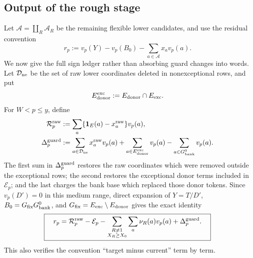 \documentclass[11pt]{article}
\numberwithin{equation}{section}
\theoremstyle{definition}
\theoremstyle{remark}
\newcommand{\1}{\mathbf 1}
\begin{document}
\subsection{Output of the rough stage}
\label{subsec:rough-output}

Let \(\mathcal A=\coprod_R\mathcal A_R\) be the remaining flexible lower
candidates, and use the residual convention
\begin{equation}
 r_p:=v_p(Y)-v_p(B_0)-\sum_{a\in\mathcal A}x_av_p(a).
 \label{eq:rough-residual-convention}
\end{equation}
We now give the full sign ledger rather than absorbing guard changes into
words.  Let \(\mathcal D_{\rm ne}\) be the set of raw lower coordinates
deleted in nonexceptional rows, and put
\[
 E_{\rm donor}^{\rm exc}:=E_{\rm donor}\cap E_{\rm exc}.
\]
For \(W<p\le y\), define
\begin{align}
 \mathcal R_p^{\rm raw}
   &:=\sum_a\{\1_E(a)-x_a^{\rm raw}\}v_p(a),\notag\\
 \Delta_p^{\rm guard}
   &:=\sum_{a\in\mathcal D_{\rm ne}}x_a^{\rm raw}v_p(a)
      +\sum_{a\in E_{\rm donor}^{\rm exc}}v_p(a)
      -\sum_{a\in G_{\rm bank}^0}v_p(a).
 \label{eq:rough-guard-difference-definition}
\end{align}
The first sum in \(\Delta_p^{\rm guard}\) restores the raw coordinates
which were removed outside the exceptional rows; the second restores the
exceptional donor terms included in \(\mathcal E_p\); and the last charges
the bank base which replaced those donor tokens.  Since
\(v_p(D')=0\) in this medium range, direct expansion of
\(Y=T/D'\), \(B_0=G_{\rm fix}G_{\rm bank}^0\), and
\(G_{\rm fix}=E_{\rm exc}\setminus E_{\rm donor}\) gives the exact
identity
\begin{equation}
 \boxed{\quad
 r_p=\mathcal R_p^{\rm raw}-\mathcal E_p
      -\sum_{\substack{R\ne1\\X_R\ge X_0}}
          \sum_a\nu_R(a)v_p(a)
      +\Delta_p^{\rm guard}.
 \quad}
 \label{eq:rough-complete-residual-algebra}
\end{equation}
This also verifies the convention ``target minus current'' term by term.
\end{document}
